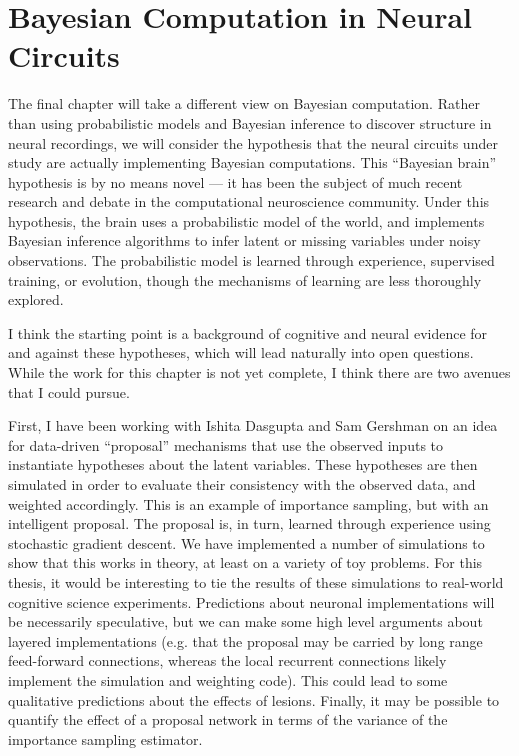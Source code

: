 \chapter{Bayesian Computation in Neural Circuits}

The final chapter will take a different view on Bayesian computation.
Rather than using probabilistic models and Bayesian inference to 
discover structure in neural recordings, we will consider the 
hypothesis that the neural circuits under study are actually 
implementing Bayesian computations. This ``Bayesian brain'' hypothesis 
is by no means novel --- it has been the subject of much recent 
research and debate in the computational neuroscience community. 
Under this hypothesis, the brain uses a probabilistic model 
of the world, and implements Bayesian inference algorithms to 
infer latent or missing variables under noisy observations. 
The probabilistic model is learned through experience, supervised 
training, or evolution, though the mechanisms of learning are 
less thoroughly explored. 

I think the starting point is a background of cognitive and neural 
evidence for and against these hypotheses, which will lead naturally 
into open questions. While the work for this chapter is not yet 
complete, I think there are two avenues that I could pursue. 

First, I have been working with Ishita Dasgupta and Sam Gershman 
on an idea for data-driven ``proposal'' mechanisms that use 
the observed inputs to instantiate hypotheses about the latent 
variables. These hypotheses are then simulated in order to 
evaluate their consistency with the observed data, and weighted 
accordingly. This is an example of importance sampling, but 
with an intelligent proposal. The proposal is, in turn, learned 
through experience using stochastic gradient descent.  We 
have implemented a number of simulations to show that this 
works in theory, at least on a variety of toy problems. 
For this thesis, it would be interesting to tie the 
results of these simulations to real-world cognitive science 
experiments. Predictions about neuronal implementations 
will be necessarily speculative, but we can make some high 
level arguments about layered implementations (e.g. that the 
proposal may be carried by long range feed-forward connections, 
whereas the local recurrent connections likely implement the simulation
and weighting code). This could lead to some qualitative 
predictions about the effects of lesions. Finally, it may be possible 
to quantify the effect of a proposal network in terms of the 
variance of the importance sampling estimator. 

